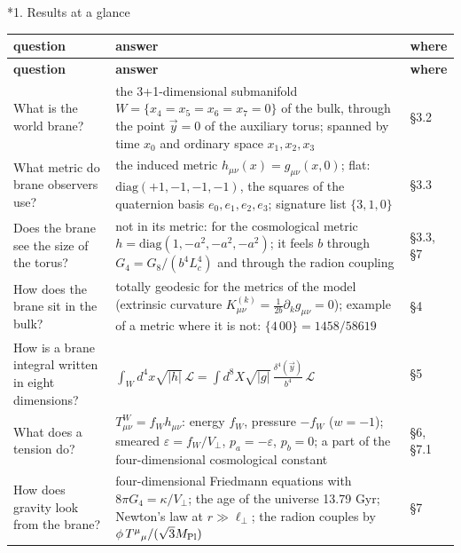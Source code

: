\documentclass[10pt,a4paper]{article}
\makeatletter
\renewcommand\section{\@startsection{section}{1}{\z@}{-3.5ex \@plus -1ex \@minus -.2ex}{2.3ex \@plus.2ex}{\normalfont\Large\bfseries\raggedright}}
\makeatother
\begin{document}
\tableofcontents
{}\section*{1. Results at a glance}
{\footnotesize
\begin{longtable}{>{\raggedright\arraybackslash}p{}>{\raggedright\arraybackslash}p{}>{\raggedright\arraybackslash}p{}}
\toprule
\textbf{question} & \textbf{answer} & \textbf{where} \\
\midrule\endfirsthead
\toprule
\textbf{question} & \textbf{answer} & \textbf{where} \\
\midrule\endhead
\endfoot
\bottomrule\endlastfoot
What is the world brane? & the 3+1-dimensional submanifold $W=\{x_4=x_5=x_6=x_7=0\}$ of the bulk, through the point $\vec y=0$ of the auxiliary torus; spanned by time $x_0$ and ordinary space $x_1,x_2,x_3$ & §3.2 \\
What metric do brane observers use? & the induced metric $h_{\mu\nu}(x)=g_{\mu\nu}(x,0)$; flat: $\mathrm{diag}(+1,-1,-1,-1)$, the squares of the quaternion basis $e_0,e_1,e_2,e_3$; signature list $\{3,1,0\}$ & §3.3 \\
Does the brane see the size of the torus? & not in its metric: for the cosmological metric $h=\mathrm{diag}(1,-a^2,-a^2,-a^2)$; it feels $b$ through $G_4=G_8/(b^4L_c^4)$ and through the radion coupling & §3.3, §7 \\
How does the brane sit in the bulk? & totally geodesic for the metrics of the model (extrinsic curvature $K^{(k)}_{\mu\nu}=\frac1{2b}\partial_kg_{\mu\nu}=0$); example of a metric where it is not: $\{4\,00\}=1458/58619$ & §4 \\
How is a brane integral written in eight dimensions? & $\int_Wd^4x\sqrt{|h|}\,\mathcal L=\int d^8X\sqrt{|g|}\,\frac{\delta^4(\vec y)}{b^4}\,\mathcal L$ & §5 \\
What does a tension do? & $T^W_{\mu\nu}=f_Wh_{\mu\nu}$: energy $f_W$, pressure $-f_W$ ($w=-1$); smeared $\varepsilon=f_W/V_\perp$, $p_a=-\varepsilon$, $p_b=0$; a part of the four-dimensional cosmological constant & §6, §7.1 \\
How does gravity look from the brane? & four-dimensional Friedmann equations with $8\pi G_4=\kappa/V_\perp$; the age of the universe 13.79 Gyr; Newton’s law at $r\gg\ell_\perp$; the radion couples by $\phi\,T^\mu{}_\mu/(\sqrt3M_{\rm Pl})$ & §7 \\

\end{longtable}}
\end{document}
